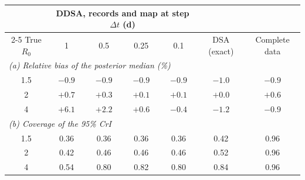 \begin{tabular}{c cccc c c}
\toprule
& \multicolumn{4}{c}{DDSA, records and map at step $\Delta t$ (d)} & & \\
\cmidrule(lr){2-5}
True $R_0$ & 1 & 0.5 & 0.25 & 0.1 & DSA (exact) & Complete data \\
\midrule
\multicolumn{7}{l}{\textit{(a) Relative bias of the posterior median (\%)}} \\
1.5 & $-0.9$ & $-0.9$ & $-0.9$ & $-0.9$ & $-1.0$ & $-0.9$ \\
2 & ${+}0.7$ & ${+}0.3$ & ${+}0.1$ & ${+}0.1$ & ${+}0.0$ & ${+}0.6$ \\
4 & ${+}6.1$ & ${+}2.2$ & ${+}0.6$ & $-0.4$ & $-1.2$ & $-0.9$ \\
\midrule
\multicolumn{7}{l}{\textit{(b) Coverage of the 95\% CrI}} \\
1.5 & 0.36 & 0.36 & 0.36 & 0.36 & 0.42 & 0.96 \\
2 & 0.42 & 0.46 & 0.46 & 0.46 & 0.52 & 0.96 \\
4 & 0.54 & 0.80 & 0.82 & 0.80 & 0.84 & 0.96 \\
\bottomrule
\end{tabular}
